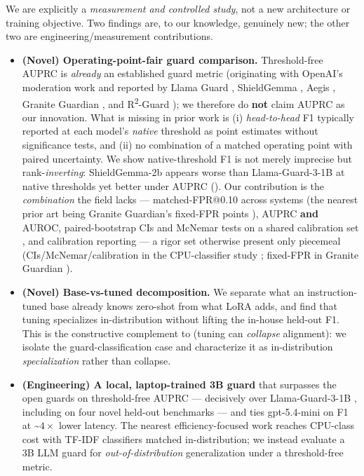 \documentclass[sigconf,nonacm]{acmart}
\begin{document}
We are explicitly a \emph{measurement and controlled study}, not a new architecture or training objective. Two findings are, to our knowledge, genuinely new; the other two are engineering/measurement contributions.

\begin{itemize}
\item \textbf{(Novel) Operating-point-fair guard comparison.} Threshold-free AUPRC is \emph{already} an established guard metric (originating with OpenAI's moderation work \cite{markov2023holistic} and reported by Llama Guard \cite{inan2023llamaguard}, ShieldGemma \cite{zeng2024shieldgemma}, Aegis \cite{ghosh2024aegis}, Granite Guardian \cite{padhi2024graniteguardian}, and R\textsuperscript{2}-Guard \cite{kang2025r2guard}); we therefore do \textbf{not} claim AUPRC as our innovation. What is missing in prior work is (i) \emph{head-to-head} F1 typically reported at each model's \emph{native} threshold as point estimates without significance tests, and (ii) no combination of a matched operating point with paired uncertainty. We show native-threshold F1 is not merely imprecise but rank-\emph{inverting}: ShieldGemma-2b \cite{zeng2024shieldgemma} appears worse than Llama-Guard-3-1B \cite{fedorov2024llamaguard3_1b} at native thresholds yet better under AUPRC (). Our contribution is the \emph{combination} the field lacks --- matched-FPR@0.10 across systems (the nearest prior art being Granite Guardian's fixed-FPR points \cite{padhi2024graniteguardian}), AUPRC \textbf{and} AUROC, paired-bootstrap CIs and McNemar tests on a shared calibration set \cite{guo2017calibration}, and calibration reporting --- a rigor set otherwise present only piecemeal (CIs/McNemar/calibration in the CPU-classifier study \cite{majhi2025gpuguard}; fixed-FPR in Granite Guardian \cite{padhi2024graniteguardian}).
\item \textbf{(Novel) Base-vs-tuned decomposition.} We separate what an instruction-tuned base \cite{bakouch2025smollm3,ouyang2022instructgpt} already knows zero-shot from what LoRA \cite{hu2021lora} adds, and find that tuning specializes in-distribution without lifting the in-house held-out F1. This is the constructive complement to \cite{hsiung2025guardrails} (tuning can \emph{collapse} alignment): we isolate the guard-classification case and characterize it as in-distribution \emph{specialization} rather than collapse.
\item \textbf{(Engineering) A local, laptop-trained 3B guard} that surpasses the open guards on threshold-free AUPRC --- decisively over Llama-Guard-3-1B \cite{fedorov2024llamaguard3_1b}, including on four novel held-out benchmarks --- and ties gpt-5.4-mini on F1 at \textasciitilde{}$4\times$ lower latency. The nearest efficiency-focused work \cite{majhi2025gpuguard} reaches CPU-class cost with TF-IDF classifiers matched in-distribution; we instead evaluate a 3B LLM guard for \emph{out-of-distribution} generalization under a threshold-free metric.

\end{itemize}
\end{document}
